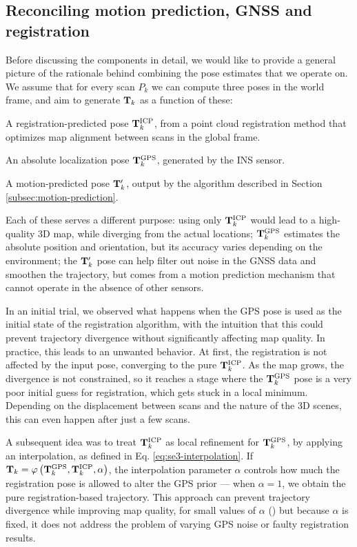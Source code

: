 \subsection{Reconciling motion prediction, GNSS and registration}
Before discussing the components in detail, we would like to provide a general picture of the rationale behind combining the pose estimates that we operate on. We assume that for every scan $P_k$ we can compute three poses in the world frame, and aim to generate $\mathbf{T}_k$ as a function of these:
\newcommand{\tkicp}{\pose_k^{\text{ICP}}}
\newcommand{\tkgps}{\pose_k^{\text{GPS}}}
\newcommand{\covicp}{\matx{\Sigma}_{\text{ICP}}}
\newcommand{\covgps}{\matx{\Sigma}_{\text{GPS}}}
\begin{compactenum}
	\item A registration-predicted pose $\tkicp$, from a point cloud registration method that optimizes map alignment between scans in the global frame.
	\item An absolute localization pose $\tkgps$, generated by the INS sensor.
	\item A motion-predicted pose $\mathbf{T}_k'$, output by the algorithm described in Section \ref{subsec:motion-prediction}.
\end{compactenum}

Each of these serves a different purpose: using only $\tkicp$ would lead to a high-quality 3D map, while diverging from the actual locations; $\tkgps$ estimates the absolute position and orientation, but its accuracy varies depending on the environment; the $\mathbf{T}_k'$ pose can help filter out noise in the GNSS data and smoothen the trajectory, but comes from a motion prediction mechanism that cannot operate in the absence of other sensors.

In an initial trial, we observed what happens when the GPS pose is used as the initial state of the registration algorithm, with the intuition that this could prevent trajectory divergence without significantly affecting map quality. In practice, this leads to an unwanted behavior. At first, the registration is not affected by the input pose, converging to the pure $\tkicp$. As the map grows, the divergence is not constrained, so it reaches a stage where the $\tkgps$ pose is a very poor initial guess for registration, which gets stuck in a local minimum. Depending on the displacement between scans and the nature of the 3D scenes, this can even happen after just a few scans.

A subsequent idea was to treat $\tkicp$ as local refinement for $\tkgps$, by applying an interpolation, as defined in Eq. \ref{eq:se3-interpolation}. If $\pose_k = \varphi\left(\tkgps, \tkicp, \alpha\right)$, the interpolation parameter $\alpha$ controls how much the registration pose is allowed to alter the GPS prior --- when $\alpha = 1$, we obtain the pure registration-based trajectory. This approach can prevent trajectory divergence while improving map quality, for small values of $\alpha$ () but because $\alpha$ is fixed, it does not address the problem of varying GPS noise or faulty registration results.

